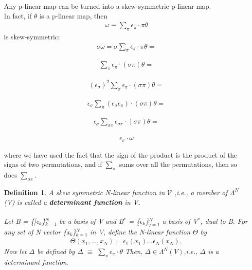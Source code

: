 \documentclass[12pt,a4paper]{article}
\newtheorem{defn}[thm]{Definition}
\begin{document}
\hspace{1cm} Any p-linear map can be turned into a skew-symmetric p-linear map.\\ In
fact, if $\theta$ is a p-linear map, then
\begin{align*}
\omega \equiv \sum_\pi \epsilon_\pi \cdot \pi \theta
\end{align*}
is skew-symmetric:
\begin{align*}
\sigma \omega = \sigma \sum_\pi \epsilon_\pi \cdot \pi \theta =
\end{align*}

\begin{align*}
 \sum_\pi \epsilon_\pi \cdot (\sigma \pi) \theta =
\end{align*}

\begin{align*}
(\epsilon_\sigma)^2 \sum_\pi \epsilon_\pi \cdot (\sigma \pi)\theta =
\end{align*}

\begin{align*}
\epsilon_\sigma \sum_\pi (\epsilon_\sigma \epsilon_\pi) \cdot (\sigma \pi)\theta =
\end{align*}

\begin{align*}
\epsilon_\sigma \sum_{\sigma \pi} \epsilon_{\sigma \pi} \cdot (\sigma \pi) \theta =
\end{align*}

\begin{align*}
\epsilon_\sigma \cdot \omega
\end{align*}

where we have used the fact that the sign of the product is the product of the
signs of two permutations, and if $\sum_\pi$ sums over all the permutations, then so does $\sum_{\sigma \pi}$.
\begin{defn}
A skew symmetric N-linear function in $\mathcal{V}$ ,i.e., a member of $\Lambda^N$(V) is called a \textbf{determinant function} in V.\\\\
Let B = \{|e$_k$\}$^{N}_{k=1}$ be a basis of V and B$^*$ = \{$\epsilon_k$\}$^N_{j=1}$ a basis of V$^*$, dual to B. For any set of N vector \{x$_k$\}$^N_{k=1}$ in V, define the N-linear function $\Theta$ by 
\begin{eqnarray*}
	\Theta(x_1,...,x_N) = \epsilon_1(x_1)...\epsilon_N(x_N),
\end{eqnarray*} 
Now let $\Delta$ be defined by $\Delta$ $\equiv$ $\sum_{\pi}\epsilon_{\pi} \cdot \theta$ Then, $\Delta \in \Lambda^N(V)$,i.e., $\Delta$ is a determinant function.
\end{defn}
\end{document}
